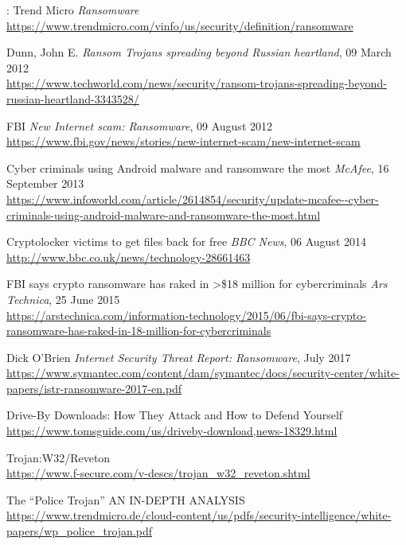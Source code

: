 \documentclass[10pt,a4paper]{article}
\begin{document}
\newpage

\begin{thebibliography}{1}

:
Trend Micro
\textit{Ransomware}
\\\url{https://www.trendmicro.com/vinfo/us/security/definition/ransomware}

Dunn, John E.
\textit{Ransom Trojans spreading beyond Russian heartland}, 09 March 2012
\\\url{https://www.techworld.com/news/security/ransom-trojans-spreading-beyond-russian-heartland-3343528/}

FBI
\textit{New Internet scam: Ransomware}, 09 August 2012
\\\url{https://www.fbi.gov/news/stories/new-internet-scam/new-internet-scam}

Cyber criminals using Android malware and ransomware the most
\textit{McAfee}, 16 September 2013
\\\url{https://www.infoworld.com/article/2614854/security/update-mcafee--cyber-criminals-using-android-malware-and-ransomware-the-most.html}

Cryptolocker victims to get files back for free
\textit{BBC News}, 06 August 2014
\\\url{http://www.bbc.co.uk/news/technology-28661463}

FBI says crypto ransomware has raked in \textgreater\$18 million for cybercriminals
\textit{Ars Technica}, 25 June 2015
\\\url{https://arstechnica.com/information-technology/2015/06/fbi-says-crypto-ransomware-has-raked-in-18-million-for-cybercriminals}

Dick O’Brien
\textit{Internet Security Threat Report: Ransomware}, July 2017
\\\url{https://www.symantec.com/content/dam/symantec/docs/security-center/white-papers/istr-ransomware-2017-en.pdf}

Drive-By Downloads: How They Attack and How to Defend Yourself
\\\url{https://www.tomsguide.com/us/driveby-download,news-18329.html}

Trojan:W32/Reveton
\\\url{https://www.f-secure.com/v-descs/trojan_w32_reveton.shtml}

The “Police Trojan”
AN IN-DEPTH ANALYSIS
\\\url{https://www.trendmicro.de/cloud-content/us/pdfs/security-intelligence/white-papers/wp_police_trojan.pdf}


\end{thebibliography}
\end{document}
